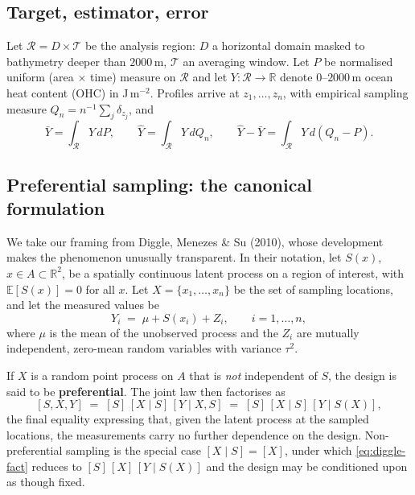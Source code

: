 \documentclass[11pt]{article}
\begin{document}
\subsection{Target, estimator, error}

Let $\mathcal{R} = D \times \mathcal{T}$ be the analysis region: $D$ a horizontal domain masked
to bathymetry deeper than $2000$\,m, $\mathcal{T}$ an averaging window. Let $P$ be normalised
uniform (area $\times$ time) measure on $\mathcal{R}$ and let $Y : \mathcal{R} \to \mathbb{R}$
denote $0$--$2000$\,m ocean heat content (OHC) in J\,m$^{-2}$. Profiles arrive at
$z_1,\dots,z_n$, with empirical sampling measure $Q_n = n^{-1}\sum_j \delta_{z_j}$, and
\begin{equation}
  \bar{Y} = \int_{\mathcal{R}} Y \, dP,
  \qquad
  \hat{Y} = \int_{\mathcal{R}} Y \, dQ_n,
  \qquad
  \hat{Y} - \bar{Y} = \int_{\mathcal{R}} Y \, d(Q_n - P).
\end{equation}

\subsection{Preferential sampling: the canonical formulation}
\label{sec:diggle}

We take our framing from Diggle, Menezes \& Su (2010), whose development makes the phenomenon
unusually transparent. In their notation, let $S(x)$, $x \in A \subset \mathbb{R}^2$, be a
spatially continuous latent process on a region of interest, with $\mathbb{E}[S(x)] = 0$ for
all $x$. Let $X = \{x_1,\dots,x_n\}$ be the set of sampling locations, and let the measured
values be
\begin{equation}
  \label{eq:diggle}
  Y_i \;=\; \mu + S(x_i) + Z_i, \qquad i = 1,\dots,n,
\end{equation}
where $\mu$ is the mean of the unobserved process and the $Z_i$ are mutually independent,
zero-mean random variables with variance $\tau^2$.

If $X$ is a random point process on $A$ that is \emph{not} independent of $S$, the design is
said to be \textbf{preferential}. The joint law then factorises as
\begin{equation}
  \label{eq:diggle-fact}
  [S, X, Y] \;=\; [S]\,[X \mid S]\,[Y \mid X, S] \;=\; [S]\,[X \mid S]\,[Y \mid S(X)],
\end{equation}
the final equality expressing that, given the latent process at the sampled locations, the
measurements carry no further dependence on the design. Non-preferential sampling is the
special case $[X \mid S] = [X]$, under which \eqref{eq:diggle-fact} reduces to
$[S]\,[X]\,[Y \mid S(X)]$ and the design may be conditioned upon as though fixed.
\end{document}

